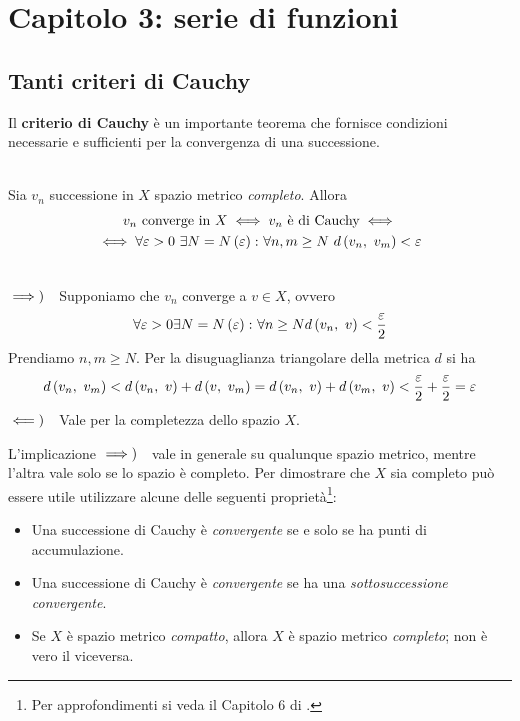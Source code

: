 \section{Capitolo 3: serie di funzioni}
\subsection{Tanti criteri di Cauchy}\label{criteriodicauchy}
Il \textbf{criterio di Cauchy} è un importante teorema che fornisce condizioni necessarie e sufficienti per la convergenza di una successione.
\begin{theorema}~{}\\
		Sia $v_n$ successione in $X$ spazio metrico \textit{completo}. Allora
	\begin{multline}
		v_n\text{ converge in }X \iff v_n\text{ è di Cauchy}\iff\\
		\iff\forall \epsilon >0\ \exists N=N\left(\epsilon\right)\colon\forall n,m\geq N\ \mvf{d}{v_n}{v_m}<\epsilon
	\end{multline}
\end{theorema}
\begin{demonstration}~{}\\
	$\implies)\quad$Supponiamo che $v_n$ converge a $v\in X$, ovvero
	\begin{equation*}
		\forall \varepsilon>0\exists N=N\left(\varepsilon\right)\colon\forall n\geq Nd\left(v_n,\ v\right)<\frac{\varepsilon}{2}
	\end{equation*}
	Prendiamo $n,m\geq N$. Per la disuguaglianza triangolare della metrica $d$ si ha
	\begin{equation*}
		d\left(v_n,\ v_m\right)<d\left(v_n,\ v\right)+d\left(v,\ v_m\right)=d\left(v_n,\ v\right)+d\left(v_m,\ v\right)<\frac{\varepsilon}{2}+\frac{\varepsilon}{2}=\varepsilon
	\end{equation*}
	$\impliedby)\quad$Vale per la completezza dello spazio $X$.
\end{demonstration}
\begin{observe}
	L'implicazione $\implies)\quad$vale in generale su qualunque spazio metrico, mentre l'altra vale solo se lo spazio è completo. Per dimostrare che $X$ sia completo può essere utile utilizzare alcune delle seguenti proprietà\footnote{Per approfondimenti si veda il Capitolo 6 di \cite{antucabertolotti:2021manualozzogeometria}.}:
	\begin{itemize}
		\item Una successione di Cauchy è \textit{convergente} se e solo se ha punti di accumulazione.
		\item Una successione di Cauchy è \textit{convergente} se ha una \textit{sottosuccessione convergente}.
		\item Se $X$ è spazio metrico \textit{compatto}, allora $X$ è spazio metrico \textit{completo}; non è vero il viceversa.
	\end{itemize}
\end{observe}
